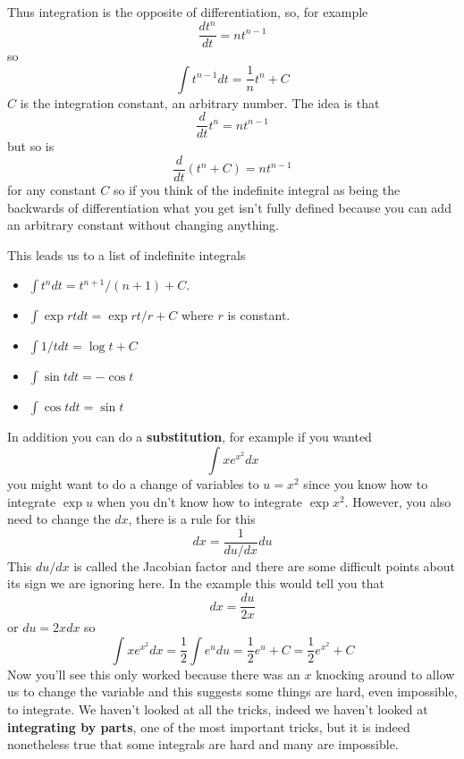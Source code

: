 \documentclass[12pt]{article}
\begin{document}
Thus integration is the opposite of differentiation, so, for example
\begin{equation}
  \frac{dt^n}{dt}=nt^{n-1}
\end{equation}
so
\begin{equation}
  \int t^{n-1}dt=\frac{1}{n}t^n+C
\end{equation}
$C$ is the integration constant, an arbitrary number. The idea is that
\begin{equation}
  \frac{d}{dt}t^n=nt^{n-1}
\end{equation}
but so is
\begin{equation}
  \frac{d}{dt}\left(t^n+C\right)=nt^{n-1}
\end{equation}
for any constant $C$ so if you think of the indefinite integral as
being the backwards of differentiation what you get isn't fully defined because you can add an arbitrary constant without changing anything.

This leads us to a list of indefinite integrals
\begin{itemize}
\item $\int t^ndt =t^{n+1}/(n+1)+C$.
\item $\int \exp{rt}dt = \exp{rt}/r +C$ where $r$ is constant.
\item $\int 1/t{} dt = \log{t}+C$
\item $\int \sin{t} dt = -\cos{t}$
\item $\int \cos{t} dt = \sin{t}$
\end{itemize}

In addition you can do a \textbf{substitution}, for example if you wanted
\begin{equation}
  \int xe^{x^2}dx
\end{equation}
you might want to do a change of variables to $u=x^2$ since you know
how to integrate $\exp{u}$ when you dn't know how to integrate
$\exp{x^2}$. However, you also need to change the $dx$, there is a
rule for this
\begin{equation}
      dx=\frac{1}{du/dx}du
\end{equation}
This $du/dx$ is called the Jacobian factor and there are some
difficult points about its sign we are ignoring here. In the example
this would tell you that
\begin{equation}
  dx=\frac{du}{2x}
\end{equation}
or $du=2xdx$ so
\begin{equation}
  \int xe^{x^2}dx=\frac{1}{2}\int e^udu=\frac{1}{2}e^u+C=\frac{1}{2}e^{x^2}+C
\end{equation}
Now you'll see this only worked because there was an $x$ knocking
around to allow us to change the variable and this suggests some
things are hard, even impossible, to integrate. We haven't looked at
all the tricks, indeed we haven't looked at \textbf{integrating by
  parts}, one of the most important tricks, but it is indeed
nonetheless true that some integrals are hard and many are impossible.
\end{document}

